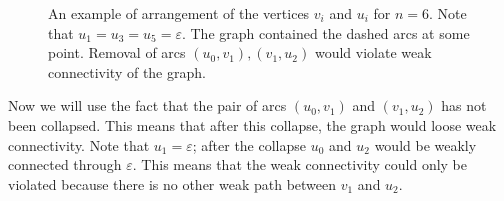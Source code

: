 \begin{figure}[ht]
\begin{center}

\end{center}

\caption{An example of arrangement of the vertices $ v_i $ and $ u_i $ for $ n = 6 $. Note that $u_1=u_3=u_5=\varepsilon$. The graph contained the dashed arcs at some point. Removal of arcs $(u_0, v_1), (v_1, u_2)$ would violate weak connectivity of the graph.}\label{fig:lvl2pathuv}
\end{figure}

Now we will use the fact that the pair of arcs $ (u_0, v_1) $ and $ (v_1, u_2) $ has not been collapsed. This means that after this collapse, the graph would loose weak connectivity. Note that $ u_1 = \varepsilon $; after the collapse $ u_0 $ and $ u_2 $ would be weakly connected through $ \varepsilon $. This means that the weak connectivity could only be violated because there is no other weak path between $ v_1 $ and $ u_2 $.

